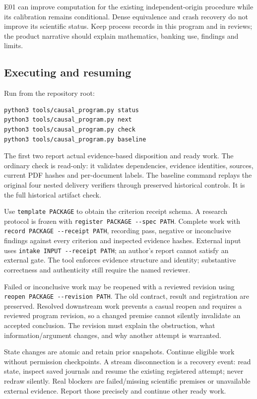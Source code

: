 \documentclass[
  11pt,
  a4paper,
]{article}
\begin{document}
E01 can improve computation for the existing independent-origin
procedure while its calibration remains conditional. Dense equivalence
and crash recovery do not improve its scientific status. Keep process
records in this program and in reviews; the product narrative should
explain mathematics, banking use, findings and limits.

\hypertarget{executing-and-resuming}{%
\subsection{Executing and resuming}\label{executing-and-resuming}}

Run from the repository root:

\begin{verbatim}
python3 tools/causal_program.py status
python3 tools/causal_program.py next
python3 tools/causal_program.py check
python3 tools/causal_program.py baseline
\end{verbatim}

The first two report actual evidence-based disposition and ready work.
The ordinary check is read-only: it validates dependencies, evidence
identities, sources, current PDF hashes and per-document labels. The
baseline command replays the original four nested delivery verifiers
through preserved historical controls. It is the full historical
artifact check.

Use \texttt{template\ PACKAGE} to obtain the criterion receipt schema. A
research protocol is frozen with
\texttt{register\ PACKAGE\ -\/-spec\ PATH}. Complete work with
\texttt{record\ PACKAGE\ -\/-receipt\ PATH}, recording pass, negative or
inconclusive findings against every criterion and inspected evidence
hashes. External input uses \texttt{intake\ INPUT\ -\/-receipt\ PATH};
an author's report cannot satisfy an external gate. The tool enforces
evidence structure and identity; substantive correctness and
authenticity still require the named reviewer.

Failed or inconclusive work may be reopened with a reviewed revision
using \texttt{reopen\ PACKAGE\ -\/-revision\ PATH}. The old contract,
result and registration are preserved. Resolved downstream work prevents
a casual reopen and requires a reviewed program revision, so a changed
premise cannot silently invalidate an accepted conclusion. The revision
must explain the obstruction, what information/argument changes, and why
another attempt is warranted.

State changes are atomic and retain prior snapshots. Continue eligible
work without permission checkpoints. A stream disconnection is a
recovery event: read state, inspect saved journals and resume the
existing registered attempt; never redraw silently. Real blockers are
failed/missing scientific premises or unavailable external evidence.
Report those precisely and continue other ready work.
\end{document}
